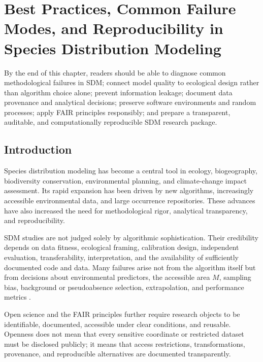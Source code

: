 \chapter[Best practices in SDM]{Best Practices, Common Failure Modes, and Reproducibility in Species Distribution Modeling}


\begin{objetivos}
By the end of this chapter, readers should be able to diagnose common methodological failures in SDM; connect model quality to ecological design rather than algorithm choice alone; prevent information leakage; document data provenance and analytical decisions; preserve software environments and random processes; apply FAIR principles responsibly; and prepare a transparent, auditable, and computationally reproducible SDM research package.
\end{objetivos}

\section{Introduction}

Species distribution modeling has become a central tool in ecology, biogeography, biodiversity conservation, environmental planning, and climate-change impact assessment. Its rapid expansion has been driven by new algorithms, increasingly accessible environmental data, and large occurrence repositories. These advances have also increased the need for methodological rigor, analytical transparency, and reproducibility.

SDM studies are not judged solely by algorithmic sophistication. Their credibility depends on data fitness, ecological framing, calibration design, independent evaluation, transferability, interpretation, and the availability of sufficiently documented code and data. Many failures arise not from the algorithm itself but from decisions about environmental predictors, the accessible area \(M\), sampling bias, background or pseudoabsence selection, extrapolation, and performance metrics \parencite{guisan2000predictive,elith2006novel,barve2011crucial,guisan2017habitat,zurell2020standard}.

Open science and the FAIR principles further require research objects to be identifiable, documented, accessible under clear conditions, and reusable. Openness does not mean that every sensitive coordinate or restricted dataset must be disclosed publicly; it means that access restrictions, transformations, provenance, and reproducible alternatives are documented transparently.

